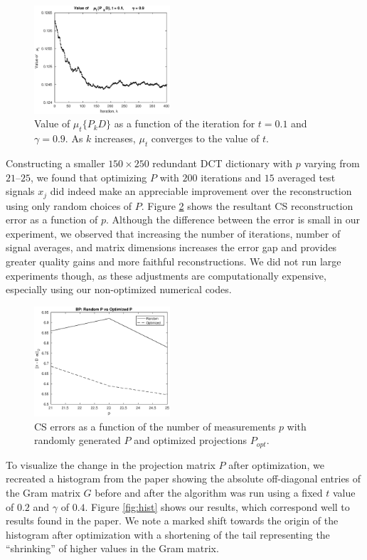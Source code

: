 \documentclass[journal]{IEEEtran}
\begin{document}
\begin{figure}[]
  \centering
  \includegraphics[width=0.45\textwidth]{mu_t_bw.eps}
  \caption{Value of $\mu_t\{P_kD\}$ as a function of the iteration for $t = 0.1$ and $\gamma = 0.9$.  As $k$ increases, $\mu_t$ converges to the value of $t$.}
  \label{fig:mu_t}
\end{figure}

Constructing a smaller $150 \times 250$ redundant DCT dictionary with $p$ varying from $21$--$25$, we found that optimizing $P$ with $200$ iterations and $15$ averaged test signals $x_j$ did indeed make an appreciable improvement over the reconstruction using only random choices of $P$.  Figure \ref{fig:err} shows the resultant CS reconstruction error as a function of $p$.  Although the difference between the error is small in our experiment, we observed that increasing the number of iterations, number of signal averages, and matrix dimensions increases the error gap and provides greater quality gains and more faithful reconstructions.  We did not run large experiments though, as these adjustments are computationally expensive, especially using our non-optimized numerical codes.

\begin{figure}[]
  \centering
  \includegraphics[width=0.45\textwidth]{rel_errors.eps}
  \caption{CS errors as a function of the number of measurements $p$ with randomly generated $P$ and optimized projections $P_{opt}$.}
  \label{fig:err}
\end{figure}

To visualize the change in the projection matrix $P$ after optimization, we recreated a histogram from the paper showing the absolute off-diagonal entries of the Gram matrix $G$ before and after the algorithm was run using a fixed $t$ value of $0.2$ and $\gamma$ of $0.4$.  Figure \ref{fig:hist} shows our results, which correspond well to results found in the paper.  We note a marked shift towards the origin of the histogram after optimization with a shortening of the tail representing the ``shrinking'' of higher values in the Gram matrix.
\end{document}
